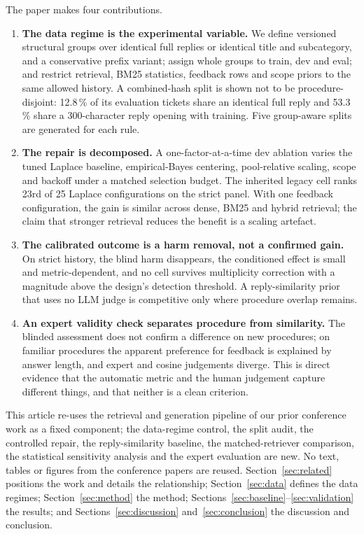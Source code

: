 \documentclass{ieeeaccess}
\begin{document}
The paper makes four contributions.

\begin{enumerate}
\item \textbf{The data regime is the experimental variable.} We define versioned
structural groups over identical full replies or identical title and subcategory,
and a conservative prefix variant; assign whole groups to train, dev and eval; and
restrict retrieval, BM25 statistics, feedback rows and scope priors to the same
allowed history. A combined-hash split is shown not to be procedure-disjoint:
12.8\,\% of its evaluation tickets share an identical full reply and 53.3\,\%
share a 300-character reply opening with training. Five
group-aware splits are generated for each rule.
\item \textbf{The repair is decomposed.} A one-factor-at-a-time dev ablation varies
the tuned Laplace baseline, empirical-Bayes centering, pool-relative scaling, scope
and backoff under a matched selection budget. The inherited legacy cell ranks 23rd
of 25 Laplace configurations on the strict panel. With one feedback configuration,
the gain is similar across dense, BM25 and hybrid retrieval; the claim that
stronger retrieval reduces the benefit is a scaling artefact.
\item \textbf{The calibrated outcome is a harm removal, not a confirmed gain.} On
strict history, the blind harm disappears, the conditioned effect is small and
metric-dependent, and no cell survives multiplicity correction with a magnitude
above the design's detection threshold. A reply-similarity prior that uses no LLM
judge is competitive only where procedure overlap remains.
\item \textbf{An expert validity check separates procedure from similarity.} The
blinded assessment does not confirm a difference on new procedures; on familiar procedures
the apparent preference for feedback is explained by answer length, and expert and
cosine judgements diverge. This is direct evidence that the automatic metric and
the human judgement capture different things, and that neither is a clean
criterion.
\end{enumerate}

This article re-uses the retrieval and generation pipeline of our prior
conference work \cite{b31,b32} as a fixed component; the data-regime control, the
split audit, the controlled repair, the reply-similarity baseline, the
matched-retriever comparison, the statistical sensitivity analysis and the expert
evaluation are new. No text, tables or figures from the conference papers are
reused. Section~\ref{sec:related} positions the work and details the relationship;
Section~\ref{sec:data} defines the data regimes; Section~\ref{sec:method} the
method; Sections~\ref{sec:baseline}--\ref{sec:validation} the results; and
Sections~\ref{sec:discussion} and~\ref{sec:conclusion} the discussion and
conclusion.
\end{document}
